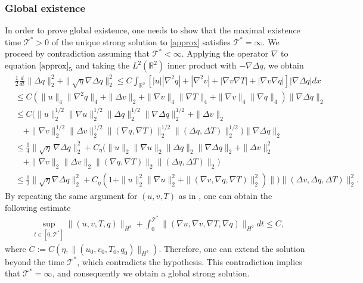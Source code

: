 \documentclass[11pt, a4paper, article,reqno,]{amsart}
\theoremstyle{remark}
\numberwithin{equation}{section}
\begin{document}
  

\subsubsection*{Global existence} 
In order to prove global existence, one needs to show that the maximal existence time $\mathcal{T}^*>0$ of the unique strong solution to \eqref{approx} satisfies $\mathcal{T}^*= \infty$. We proceed by contradiction assuming that $\mathcal{T}^* < \infty$. Applying the operator $\nabla$ to equation $\eqref{approx}_5$ and taking the $L^2(\mathbb{R}^2)$ inner product with $- \nabla \Delta q$, we obtain
\begin{equation*}
\begin{aligned}
   & \frac{1}{2} \frac{d}{dt} \|\Delta q\|_2^2 + \|\sqrt{\eta} \nabla \Delta q\|_2^2   \leq C \int_{\mathbb{R}^2} [|u| |\nabla^2 q| + |\nabla^2 v| + |\nabla v \nabla T| + |\nabla v \nabla q|] |\nabla \Delta q|dx \\
   & \leq C ( \|u\|_4 \|\nabla^2 q\|_4 + \|\Delta v\|_2 + \|\nabla v\|_4 \|\nabla T\|_4 + \|\nabla v\|_4 \|\nabla q\|_4  ) \|\nabla \Delta q\|_2 \\
   & \leq C \Big( 
    \|u\|_2^{1/2} \|\nabla u\|_2^{1/2} \|\Delta q\|_2^{1/2} \|\nabla \Delta q\|_2^{1/2} 
    + \|\Delta v\|_2 \\
&\quad + \|\nabla v\|_2^{1/2} \|\Delta v\|_2^{1/2} 
      \|(\nabla q, \nabla T)\|_2^{1/2} \|(\Delta q, \Delta T)\|_2^{1/2} 
\Big) \|\nabla \Delta q\|_2 \\
& \leq \frac{1}{4} \|\sqrt{\eta}\, \nabla \Delta q\|_2^2 
    + C_{\eta} \Big( 
        \|u\|_2 \|\nabla u\|_2 \|\Delta q\|_2 \|\nabla \Delta q\|_2 
        + \|\Delta v\|_2^2 \\
& \quad + \|\nabla v\|_2 \|\Delta v\|_2 
        \|(\nabla q, \nabla T)\|_2 \|(\Delta q, \Delta T)\|_2
      \Big) \\
   & \leq \frac{1}{2}  \|\sqrt{\eta}\nabla \Delta q\|^2_2 + C_{\eta} ( 1 + \|u\|_2^2 \|\nabla u\|_2^2 + \|(\nabla v, \nabla q, \nabla T)\|_2^2)\|)\|(\Delta v, \Delta q, \Delta T)\|_2^2.
\end{aligned}
\end{equation*}
By repeating the same argument for $(u,v,T)$ as in \cite{LT2}, one can obtain the following estimate
\begin{equation*} 
\begin{aligned} 
& \sup_{t \in [0, \mathcal{T}^*]} \|(u,v,T,q)\|_{H^2} + \int_0^{\mathcal{T}^*} \|(\nabla u, \nabla v,\nabla T, \nabla q)\|_{H^2} dt \leq C, 
\end{aligned} 
\end{equation*}
where $C := C(\eta, \|(u_0,v_0,T_0,q_0)\|_{H^2})$. Therefore, one can extend the solution beyond the time $\mathcal{T}^*$, which contradicts the hypothesis. This contradiction implies that $\mathcal{T}^*= \infty$, and consequently we obtain a global strong solution.
\end{document}
